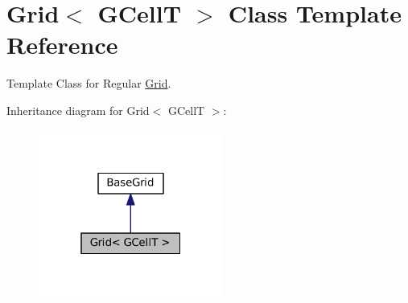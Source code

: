 \hypertarget{classKatabatic_1_1Grid}{}\section{Grid$<$ G\+CellT $>$ Class Template Reference}
\label{classKatabatic_1_1Grid}


Template Class for Regular \mbox{\hyperlink{classKatabatic_1_1Grid}{Grid}}.  




Inheritance diagram for Grid$<$ G\+CellT $>$\+:\nopagebreak
\begin{figure}[H]
\begin{center}
\leavevmode
\includegraphics[width=172pt]{classKatabatic_1_1Grid__inherit__graph}
\end{center}
\end{figure}

